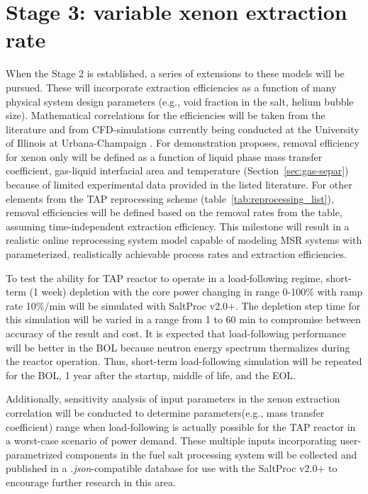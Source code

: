 \section{Stage 3: variable xenon extraction rate}
When the Stage 2 is established, a series of extensions to these models will 
be pursued. These will incorporate extraction efficiencies as a function of 
many physical system design parameters (e.g., void fraction in the salt, 
helium bubble size). Mathematical correlations for the efficiencies will be 
taken from the literature \cite{peebles_removal_1968, 
gabbard_development_1974} and from CFD-simulations currently being conducted 
at the University of Illinois at Urbana-Champaign \cite{huff_enabling_2018}. 
For demonstration proposes, removal efficiency for xenon only will be defined 
as a function of liquid phase mass transfer coefficient, gas-liquid 
interfacial area and temperature (Section~\ref{sec:gas-separ}) because of 
limited experimental data provided in the listed literature. For other 
elements from the \gls{TAP} reprocessing scheme 
(table~\ref{tab:reprocessing_list}), removal efficiencies will be defined 
based on the removal rates from the table, assuming time-independent 
extraction efficiency. This milestone will result in a realistic online 
reprocessing system model capable of modeling \gls{MSR} systems with 
parameterized, realistically achievable process rates and extraction  
efficiencies.

To test the ability for \gls{TAP} reactor to operate in a load-following 
regime, short-term (1 week) depletion with the core power changing in range 
0-100\% with ramp rate 10\%/min will be simulated with SaltProc v2.0+. The 
depletion step time for this simulation will be varied in a range from 1 to 60 
min to compromise between accuracy of the result and cost. It is expected that 
load-following performance will be better in the \gls{BOL} because neutron 
energy spectrum thermalizes during the reactor operation. Thus, short-term 
load-following simulation will be repeated for the \gls{BOL}, 1 year after the 
startup, middle of life, and the \gls{EOL}.

Additionally, sensitivity analysis of input parameters in the xenon extraction 
correlation will be conducted to determine parameters(e.g., mass transfer 
coefficient) range when load-following is actually possible for the \gls{TAP} 
reactor in a worst-case scenario of power demand. These multiple inputs 
incorporating user-parametrized components in the fuel salt processing 
system will be collected and published in a \textit{.json}-compatible database 
for use with the SaltProc v2.0+ to encourage further research in this area.



